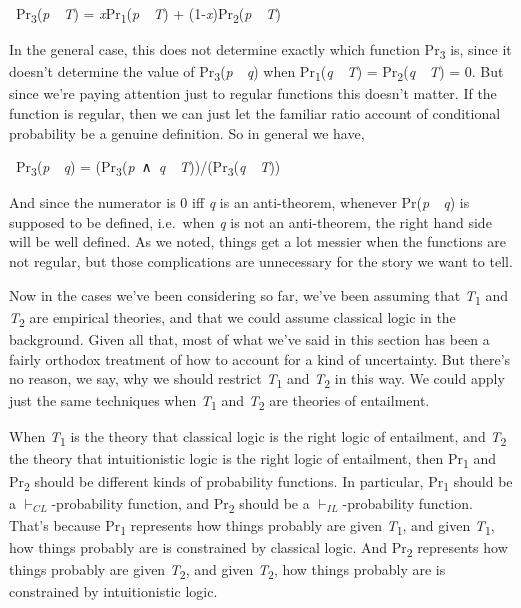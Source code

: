 \documentclass[
  10pt,
  letterpaper,
  DIV=11,
  numbers=noendperiod,
  twoside]{scrartcl}
\begin{document}
~Pr\textsubscript{3}(\emph{p}~\textbar~\emph{T}) =
\emph{x}Pr\textsubscript{1}(\emph{p}~\textbar~\emph{T}) +
(1-\emph{x})Pr\textsubscript{2}(\emph{p}~\textbar~\emph{T})

In the general case, this does not determine exactly which function
Pr\textsubscript{3} is, since it doesn't determine the value of
Pr\textsubscript{3}(\emph{p}~\textbar~\emph{q}) when
Pr\textsubscript{1}(\emph{q}~\textbar~\emph{T}) =
Pr\textsubscript{2}(\emph{q}~\textbar~\emph{T}) = 0. But since we're
paying attention just to regular functions this doesn't matter. If the
function is regular, then we can just let the familiar ratio account of
conditional probability be a genuine definition. So in general we have,

~Pr\textsubscript{3}(\emph{p}~\textbar~\emph{q}) =
(Pr\textsubscript{3}(\emph{p}~∧~\emph{q}~\textbar~\emph{T}))/(Pr\textsubscript{3}(\emph{q}~\textbar~\emph{T}))

And since the numerator is 0 iff \emph{q} is an anti-theorem, whenever
Pr(\emph{p}~\textbar~\emph{q}) is supposed to be defined, i.e.~when
\emph{q} is not an anti-theorem, the right hand side will be well
defined. As we noted, things get a lot messier when the functions are
not regular, but those complications are unnecessary for the story we
want to tell.

Now in the cases we've been considering so far, we've been assuming that
\emph{T}\textsubscript{1} and \emph{T}\textsubscript{2} are empirical
theories, and that we could assume classical logic in the background.
Given all that, most of what we've said in this section has been a
fairly orthodox treatment of how to account for a kind of uncertainty.
But there's no reason, we say, why we should restrict
\emph{T}\textsubscript{1} and \emph{T}\textsubscript{2} in this way. We
could apply just the same techniques when \emph{T}\textsubscript{1} and
\emph{T}\textsubscript{2} are theories of entailment.

When \emph{T}\textsubscript{1} is the theory that classical logic is the
right logic of entailment, and \emph{T}\textsubscript{2} the theory that
intuitionistic logic is the right logic of entailment, then
Pr\textsubscript{1} and Pr\textsubscript{2} should be different kinds of
probability functions. In particular, Pr\textsubscript{1} should be a
\(\vdash_{CL}\)-probability function, and Pr\textsubscript{2} should be
a \(\vdash_{IL}\)-probability function. That's because
Pr\textsubscript{1} represents how things probably are given
\emph{T}\textsubscript{1}, and given \emph{T}\textsubscript{1}, how
things probably are is constrained by classical logic. And
Pr\textsubscript{2} represents how things probably are given
\emph{T}\textsubscript{2}, and given \emph{T}\textsubscript{2}, how
things probably are is constrained by intuitionistic logic.
\end{document}
